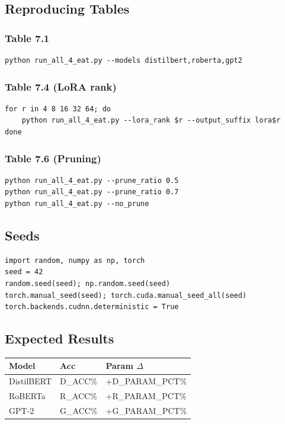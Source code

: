 \subsection{Reproducing Tables}

\subsubsection{Table 7.1}

\begin{lstlisting}
python run_all_4_eat.py --models distilbert,roberta,gpt2
\end{lstlisting}

\subsubsection{Table 7.4 (LoRA rank)}

\begin{lstlisting}
for r in 4 8 16 32 64; do
    python run_all_4_eat.py --lora_rank $r --output_suffix lora$r
done
\end{lstlisting}

\subsubsection{Table 7.6 (Pruning)}

\begin{lstlisting}
python run_all_4_eat.py --prune_ratio 0.5
python run_all_4_eat.py --prune_ratio 0.7
python run_all_4_eat.py --no_prune
\end{lstlisting}

\subsection{Seeds}

\begin{lstlisting}
import random, numpy as np, torch
seed = 42
random.seed(seed); np.random.seed(seed)
torch.manual_seed(seed); torch.cuda.manual_seed_all(seed)
torch.backends.cudnn.deterministic = True
\end{lstlisting}

\subsection{Expected Results}

\begin{table}[H]
\centering
\small
\begin{tabular}{lll}
\toprule
\textbf{Model} & \textbf{Acc} & \textbf{Param $\Delta$} \\
\midrule
DistilBERT & {{D\_ACC}}\% & +{{D\_PARAM\_PCT}}\% \\
RoBERTa & {{R\_ACC}}\% & +{{R\_PARAM\_PCT}}\% \\
GPT-2 & {{G\_ACC}}\% & +{{G\_PARAM\_PCT}}\% \\
\bottomrule
\end{tabular}
\end{table}

